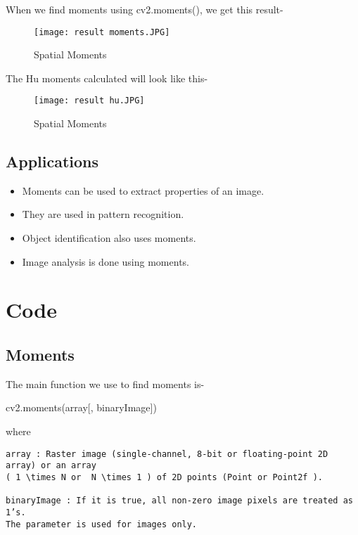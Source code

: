 \documentclass[]{article}
\newenvironment{Shaded}{}{}
\newcommand{\NormalTok}[1]{{#1}}
\providecommand{\tightlist}{%
  \setlength{\itemsep}{0pt}\setlength{\parskip}{0pt}}
\begin{document}
When we find moments using cv2.moments(), we get this result-

\begin{figure}[htbp]
\centering
\texttt{[image: result moments.JPG]}
\caption{Spatial Moments}
\end{figure}

The Hu moments calculated will look like this-

\begin{figure}[htbp]
\centering
\texttt{[image: result hu.JPG]}
\caption{Spatial Moments}
\end{figure}

\subsection{Applications}\label{applications}

\begin{itemize}
\tightlist
\item
  Moments can be used to extract properties of an image.
\item
  They are used in pattern recognition.
\item
  Object identification also uses moments.
\item
  Image analysis is done using moments.
\end{itemize}

\section{Code}\label{code}

\subsection{Moments}\label{moments}

The main function we use to find moments is-

\begin{Shaded}
\begin{Highlighting}[]
    \NormalTok{cv2.moments(array[, binaryImage])}
\end{Highlighting}
\end{Shaded}

where

\begin{verbatim}
array : Raster image (single-channel, 8-bit or floating-point 2D array) or an array 
( 1 \times N or  N \times 1 ) of 2D points (Point or Point2f ).

binaryImage : If it is true, all non-zero image pixels are treated as 1’s. 
The parameter is used for images only.
\end{verbatim}
\end{document}
